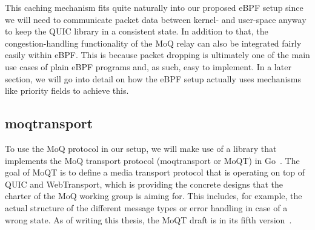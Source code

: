 This caching mechanism fits quite naturally into our proposed eBPF setup since we will need to 
communicate packet data between kernel- and user-space anyway to keep the QUIC library in a 
consistent state.
In addition to that, the congestion-handling functionality of the MoQ relay can also
be integrated fairly easily within eBPF\@.
This is because packet dropping is ultimately one of the main use cases of plain eBPF 
programs and, as such, easy to implement.
In a later section, we will go into detail on how the eBPF setup actually uses mechanisms like 
priority fields to achieve this.

\subsection{moqtransport}
To use the MoQ protocol in our setup, we will make use of a library that implements 
the MoQ transport protocol (moqtransport or MoQT) in Go~\parencite{priority-moqtransport-repo}.
The goal of MoQT is to define a media transport protocol that is operating on top
of QUIC and WebTransport, which is providing the concrete designs that the charter of 
the MoQ working group is aiming for.
This includes, for example, the actual structure of the different message types or error handling in case 
of a wrong state.
As of writing this thesis, the MoQT draft is in its fifth version~\parencite{draft-moqtransport}.
